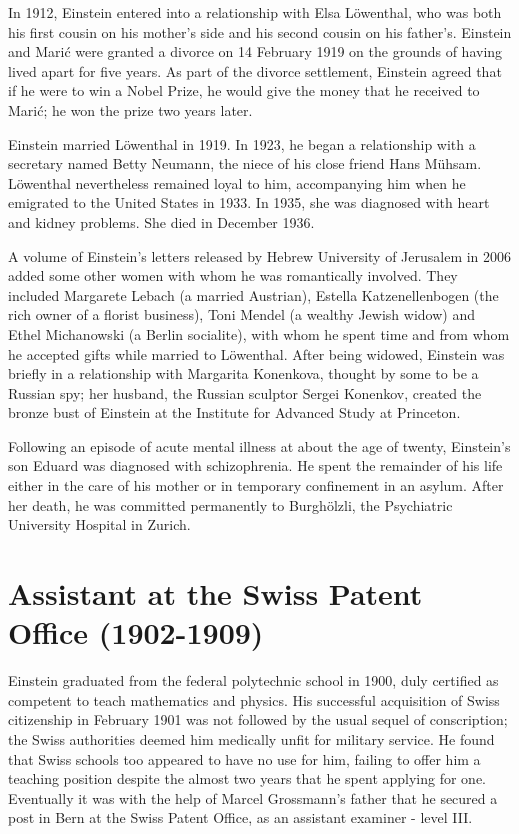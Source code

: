 \documentclass[twoside]{memoir}
\begin{document}
In 1912, Einstein entered into a relationship with Elsa Löwenthal,  who was both his first cousin on his mother's side and his second cousin on his father's. Einstein and Marić were granted a divorce on 14 February 1919 on the grounds of having lived apart for five years. As part of the divorce settlement, Einstein agreed that if he were to win a Nobel Prize, he would give the money that he received to Marić; he won the prize two years later.

Einstein married Löwenthal in 1919. In 1923, he began a relationship with a secretary named Betty Neumann,  the niece of his close friend Hans Mühsam. Löwenthal nevertheless remained loyal to him, accompanying him when he emigrated to the United States in 1933. In 1935, she was diagnosed with heart and kidney problems. She died in December 1936. 

A volume of Einstein's letters released by Hebrew University of Jerusalem in 2006 added some other women with whom he was romantically involved. They included Margarete Lebach (a married Austrian), Estella Katzenellenbogen (the rich owner of a florist business), Toni Mendel  (a wealthy Jewish widow) and Ethel Michanowski (a Berlin socialite), with whom he spent time and from whom he accepted gifts while married to Löwenthal. After being widowed, Einstein was briefly in a relationship with Margarita Konenkova, thought by some to be a Russian spy; her husband, the Russian sculptor Sergei Konenkov, created the bronze bust of Einstein at the Institute for Advanced Study at Princeton.

Following an episode of acute mental illness at about the age of twenty, Einstein's son Eduard was diagnosed with schizophrenia. He spent the remainder of his life either in the care of his mother or in temporary confinement in an asylum. After her death, he was committed permanently to Burghölzli, the Psychiatric University Hospital in Zurich.

\chapter{Assistant at the Swiss Patent Office (1902-1909)}\label{assistant-at-the-swiss-patent-office-1902-1909}

Einstein graduated from the federal polytechnic school in 1900, duly certified as competent to teach mathematics and physics. His successful acquisition of Swiss citizenship in February 1901 was not followed by the usual sequel of conscription; the Swiss authorities deemed him medically unfit for military service. He found that Swiss schools too appeared to have no use for him, failing to offer him a teaching position despite the almost two years that he spent applying for one. Eventually it was with the help of Marcel Grossmann's  father that he secured a post in Bern at the Swiss Patent Office,\cite{ODY5p} as an assistant examiner - level III.\cite{MeZPN}
\end{document}
